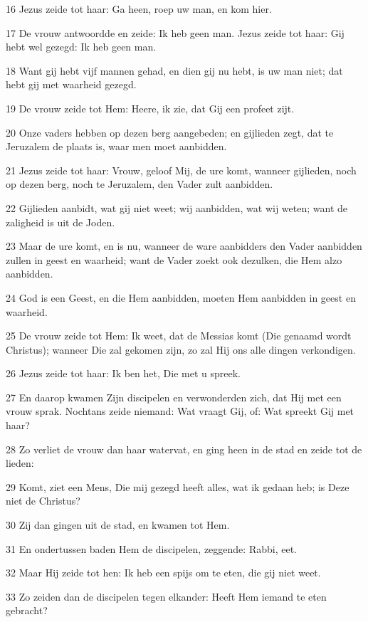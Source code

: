 \par 16 Jezus zeide tot haar: Ga heen, roep uw man, en kom hier.
\par 17 De vrouw antwoordde en zeide: Ik heb geen man. Jezus zeide tot haar: Gij hebt wel gezegd: Ik heb geen man.
\par 18 Want gij hebt vijf mannen gehad, en dien gij nu hebt, is uw man niet; dat hebt gij met waarheid gezegd.
\par 19 De vrouw zeide tot Hem: Heere, ik zie, dat Gij een profeet zijt.
\par 20 Onze vaders hebben op dezen berg aangebeden; en gijlieden zegt, dat te Jeruzalem de plaats is, waar men moet aanbidden.
\par 21 Jezus zeide tot haar: Vrouw, geloof Mij, de ure komt, wanneer gijlieden, noch op dezen berg, noch te Jeruzalem, den Vader zult aanbidden.
\par 22 Gijlieden aanbidt, wat gij niet weet; wij aanbidden, wat wij weten; want de zaligheid is uit de Joden.
\par 23 Maar de ure komt, en is nu, wanneer de ware aanbidders den Vader aanbidden zullen in geest en waarheid; want de Vader zoekt ook dezulken, die Hem alzo aanbidden.
\par 24 God is een Geest, en die Hem aanbidden, moeten Hem aanbidden in geest en waarheid.
\par 25 De vrouw zeide tot Hem: Ik weet, dat de Messias komt (Die genaamd wordt Christus); wanneer Die zal gekomen zijn, zo zal Hij ons alle dingen verkondigen.
\par 26 Jezus zeide tot haar: Ik ben het, Die met u spreek.
\par 27 En daarop kwamen Zijn discipelen en verwonderden zich, dat Hij met een vrouw sprak. Nochtans zeide niemand: Wat vraagt Gij, of: Wat spreekt Gij met haar?
\par 28 Zo verliet de vrouw dan haar watervat, en ging heen in de stad en zeide tot de lieden:
\par 29 Komt, ziet een Mens, Die mij gezegd heeft alles, wat ik gedaan heb; is Deze niet de Christus?
\par 30 Zij dan gingen uit de stad, en kwamen tot Hem.
\par 31 En ondertussen baden Hem de discipelen, zeggende: Rabbi, eet.
\par 32 Maar Hij zeide tot hen: Ik heb een spijs om te eten, die gij niet weet.
\par 33 Zo zeiden dan de discipelen tegen elkander: Heeft Hem iemand te eten gebracht?

